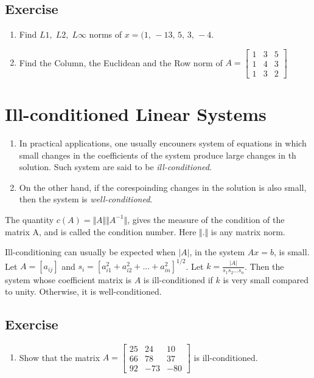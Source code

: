 \documentclass[aima203_lecturenotes_ku.tex]{subfiles}
\begin{document}
\subsection{Exercise}
\begin{enumerate}
\item Find $L1, \; L2, \; L\infty$ norms of $x=(1,\,-13,\,5,\,3,\,-4$.
\item Find the Column, the Euclidean and the Row norm of $A =
  \begin{bmatrix}
    1 & 3 & 5 \\
    1 & 4 & 3 \\
    1 & 3 & 2
  \end{bmatrix}
  $
\end{enumerate}

\section{Ill-conditioned Linear Systems}
 \begin{enumerate}
 \item In practical applications, one usually encouners system of equations in which small changes in the coefficients of the system produce large changes in th solution. Such system are said to be \textit{ill-conditioned}.

\item On the other hand, if the corespoinding changes in the solution is also small, then the system is \textit{well-conditioned}.
\end{enumerate}

\begin{definition}
  The quantity $c(A) = \Vert A \Vert \Vert A^{-1} \Vert$, gives the measure of the condition of the matrix A, and is called the condition number. Here $\Vert . \Vert$ is any matrix norm.
\end{definition}
Ill-conditioning can usually be expected when $|A|$, in the system $Ax=b$, is small. Let $A=[a_{ij}]$ and $\displaystyle s_i = \left [ a^2_{i1} + a^2_{i2} + ... + a^2_{in} \right ] ^{1/2}$. Let $\displaystyle k = \frac{|A|}{s_1s_2...s_n}$. Then the system whose coefficient matrix is $A$ is ill-conditioned if $k$ is very small compared to unity. Otherwise, it is well-conditioned.

  \subsection{Exercise}
  \begin{enumerate}
  \item Show that the matrix $A=   \begin{bmatrix}
    25  & 24 & 10 \\
    66 & 78 & 37 \\
    92 & -73 & -80
  \end{bmatrix}
  $ is ill-conditioned.
  \end{enumerate}
\end{document}
